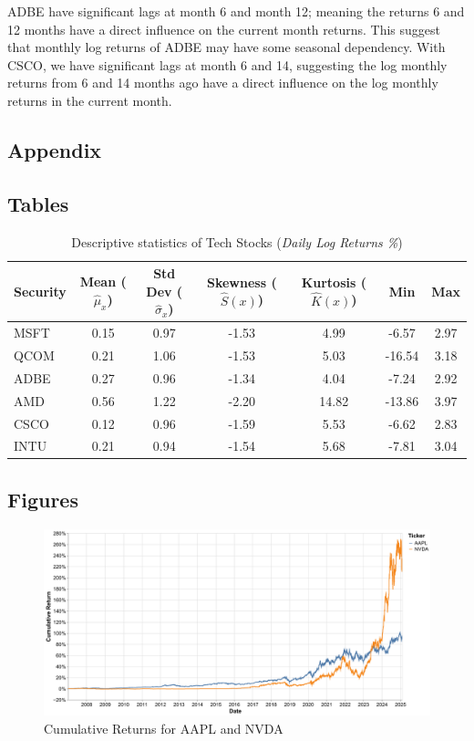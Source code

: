\documentclass[12pt]{article}
\begin{document}
ADBE have significant lags at month 6 and month 12; meaning the returns 6 and 12 months have a direct influence on the current month returns. This suggest that monthly log returns of ADBE may have some seasonal dependency. With CSCO, we have significant lags at month 6 and 14, suggesting the log monthly returns from 6 and 14 months ago have a direct influence on the log monthly returns in the current month.
\newpage
\begin{appendices}
\section{Appendix}
\subsection{Tables}
\begin{table}[ht]
	\centering
	\caption{Descriptive statistics of Tech Stocks (\textit{Daily Log Returns \%})}
	\begin{tabular}[t]{lcccccc}
		\toprule
		Security & Mean ($\hat{\mu}_x$) & Std Dev ($\hat{\sigma}_x$) & Skewness ($\hat{S}(x)$) & Kurtosis ($\hat{K}(x)$) &Min&Max \\
		\midrule
		MSFT & 0.15 & 0.97 &-1.53 & 4.99 &-6.57  &2.97  \\
		QCOM & 0.21 & 1.06 &-1.53 & 5.03 &-16.54 &3.18 \\	
		ADBE & 0.27 & 0.96 &-1.34 & 4.04 &-7.24  &2.92 \\
		AMD  & 0.56 & 1.22 &-2.20 & 14.82 &-13.86 &3.97 \\		
		CSCO & 0.12 & 0.96 &-1.59 & 5.53 &-6.62  &2.83 \\
		INTU & 0.21 & 0.94 &-1.54 & 5.68 &-7.81  &3.04 	\\	   
		\bottomrule
	\end{tabular}\label{tab:log_descriptive}
\end{table}
\newpage
\subsection{Figures}
\end{appendices}
\begin{figure}[h]
	\centering
	\includegraphics[width=0.8\linewidth]{plots/cumulative_returns_appl_nvda.png}
	\caption{Cumulative Returns for AAPL and NVDA}
\end{figure}
\end{document}
